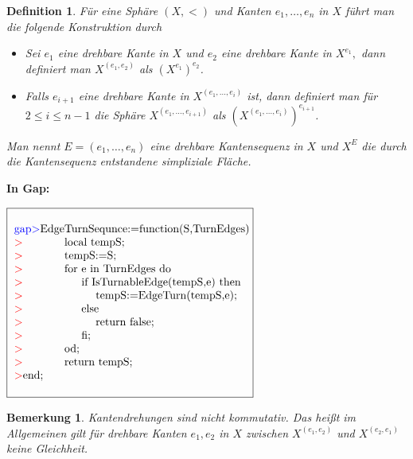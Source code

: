 \documentclass[12pt,titlepage,twoside,cleardoublepage]{article}
\theoremstyle{nummermitklammern}
\newtheorem{definition}[temp]{Definition}
\newtheorem{bemerkung}[temp]{Bemerkung}
\newtheorem{definition}[zahl]{Definition}
\newtheorem{bemerkung}[zahl]{Bemerkung}
\numberwithin{equation}{section}
\begin{document}
\begin{definition}
Für eine Sphäre $(X,<)$ und Kanten $e_1,\ldots,e_n$ in $X$ führt man die folgende Konstruktion durch
\begin{itemize}
\item Sei $e_1$ eine drehbare Kante in $X$ und $e_2$ eine drehbare Kante in $X^{e_1},$ dann definiert man $X^{(e_1,e_2)}$ als $(X^{e_1})^{e_2}$.
\item Falls $e_{i+1}$ eine drehbare Kante in $X^{(e_1,\ldots,e_{i})}$ ist, dann definiert man für $2\leq i\leq n-1$ die Sphäre $X^{(e_1,\ldots,e_{i+1})}$ als $(X^{(e_1,\ldots,e_{i})})^{e_{i+1}}$.
\end{itemize}
Man nennt $E=(e_1,\ldots,e_n)$ eine drehbare Kantensequenz in $X$ und $X^E$ die durch die Kantensequenz entstandene simpliziale Fläche. 
\end{definition}
\textbf{In Gap:}
\begin{center}
$\fbox{
\parbox{14cm}{
\begin{tabbing}
\textcolor{blue}{gap$>$}Edge\=TurnSequnce:=function(S,TurnEdges)\\
\textcolor{red}{$>$}\> local tempS;\\
\textcolor{red}{$>$}\> tempS:=S;\\
\textcolor{red}{$>$}\> for \=e in TurnEdges do\\
\textcolor{red}{$>$}\>\> if I\=sTurnableEdge(tempS,e) then\\
\textcolor{red}{$>$}\>\>\> tempS:=EdgeTurn(tempS,e);\\
\textcolor{red}{$>$}\>\> else\\
\textcolor{red}{$>$}\>\>\> return false;\\
\textcolor{red}{$>$}\> \>fi;\\
\textcolor{red}{$>$}\> od;\\
\textcolor{red}{$>$}\> return tempS;\\
\textcolor{red}{$>$}end;
\end{tabbing}
}}$
\end{center}
\begin{bemerkung}
Kantendrehungen sind nicht kommutativ. Das heißt im Allgemeinen gilt für drehbare Kanten $e_1,e_2$ in $X$ zwischen $X^{(e_1,e_2)}$ und $X^{(e_2,e_1)}$ keine Gleichheit. 

\end{bemerkung}
\end{document}
